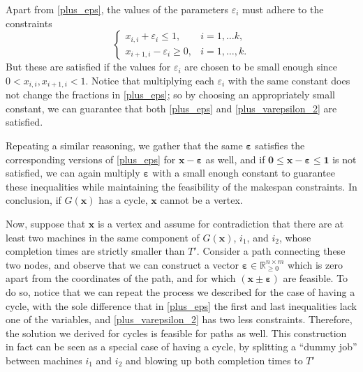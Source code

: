 \documentclass[moor,sglanonrev]{informs4}
\theoremstyle{plain}
\begin{document}
\begin{APPENDICES}
    Apart from \eqref{plus_eps}, the values of the parameters $\varepsilon_i$ must adhere to the constraints
    \begin{equation}\label{plus_varepsilon_2}
    \begin{cases}
        x_{i,i} + \varepsilon_i \le 1, & i = 1, \ldots k, \\
        x_{i+1,i} -\varepsilon_i \ge 0, & i = 1, \ldots, k.
    \end{cases}
    \end{equation}
    But these are satisfied if the values for $\varepsilon_i$ are chosen to be small enough since $0 < x_{i,i}, x_{i+1, i} < 1$. Notice that multiplying each $\varepsilon_i$ with the same constant does not change the fractions in \eqref{plus_eps}; so by choosing an appropriately small constant, we can guarantee that both \eqref{plus_eps} and \eqref{plus_varepsilon_2} are satisfied.

    Repeating a similar reasoning, we gather that the same $\bm{\varepsilon}$ satisfies the corresponding versions of \eqref{plus_eps} for $\bm{x}-\bm{\varepsilon}$ as well, and if $\bm{0} \le \bm{x}-\bm{\varepsilon} \le \mathbf{1}$ is not satisfied, we can again multiply $\bm{\varepsilon}$ with a small enough constant to guarantee these inequalities while maintaining the feasibility of the makespan constraints. In conclusion, if $G(\bm{x})$ has a cycle, $\bm{x}$ cannot be a vertex.

    Now, suppose that $\bm{x}$ is a vertex and assume for contradiction that there are at least two machines in the same component of $G(\bm{x})$, $i_1$, and $i_2$, whose completion times are strictly smaller than $T'$. Consider a path connecting these two nodes, and observe that we can construct a vector $\bm{\varepsilon} \in \mathbb{R}_{\ge 0} ^{n\times m}$ which is zero apart from the coordinates of the path, and for which $(\bm{x}\pm\bm{\varepsilon})$ are feasible. To do so, notice that we can repeat the process we described for the case of having a cycle, with the sole difference that in \eqref{plus_eps} the first and last inequalities lack one of the variables, and \eqref{plus_varepsilon_2} has two less constraints. Therefore, the solution we derived for cycles is feasible for paths as well. This construction in fact can be seen as a special case of having a cycle, by splitting a ``dummy job'' between machines $i_1$ and $i_2$ and blowing up both completion times to $T'$


\end{APPENDICES}
\end{document}
